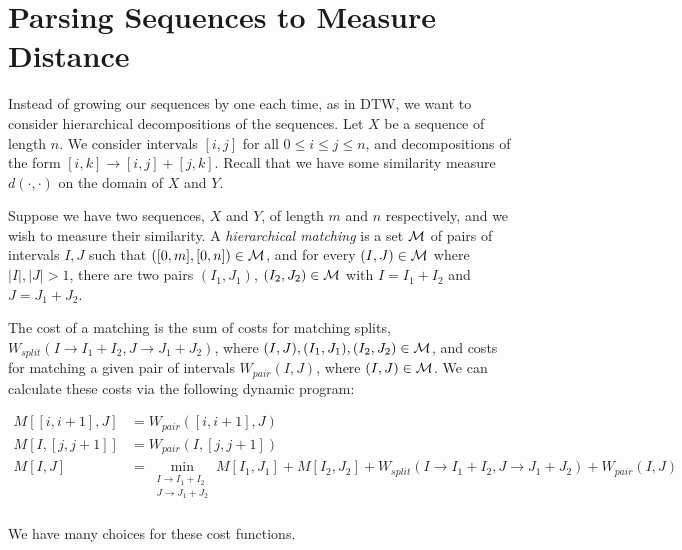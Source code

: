 \documentclass{article}
\begin{document}
\section{Parsing Sequences to Measure Distance}

Instead of growing our sequences by one each time, as in DTW, we want
to consider hierarchical decompositions of the sequences. Let $X$ be a
sequence of length $n$. We consider intervals $[i,j]$ for all $0\le i
\le j \le n$, and decompositions of the form $[i,k] \to [i,j] +
    [j,k]$.  Recall that we have some similarity measure
    $d(\cdot,\cdot)$ on the domain of $X$ and $Y$.

Suppose we have two sequences, $X$ and $Y$, of length $m$ and $n$
respectively, and we wish to measure their similarity. A {\em
  hierarchical matching} is a set ${\mathcal M}$ of pairs of intervals $I,J$
such that $([0,m], [0,n])\in {\mathcal M}$, and for every $(I,J) \in {\mathcal M}$
where $|I|, |J|> 1$, there are two pairs $(I_1, J_1)$, $(I_2, J_2)\in
{\mathcal M}$ with $I=I_1 + I_2$ and $J=J_1 + J_2$.

The cost of a matching is the sum of costs for matching splits,
$W_{split}(I\to I_1 + I_2, J\to J_1 + J_2)$, where $(I,J), (I_1,J_1),
(I_2,J_2)\in {\mathcal M}$, and costs for matching a given pair of intervals
$W_{pair}(I,J)$, where $(I,J)\in {\mathcal M}$.
We can calculate these costs via the following dynamic program:

\begin{align*}
M[[i,i+1],J] &= W_{pair}([i, i+1],J)\\
M[I,[j, j+1]] &= W_{pair}(I,[j,j+1])\\
M[I,J] &= \min_{\substack{I\to I_1 + I_2 \\ J\to J_1 + J_2}} 
M[I_1, J_1] + M[I_2, J_2] + W_{split}(I\to I_1 + I_2, J\to J_1 + J_2) + W_{pair}(I,J)\\
\end{align*}

We have many choices for these cost functions.
\end{document}

